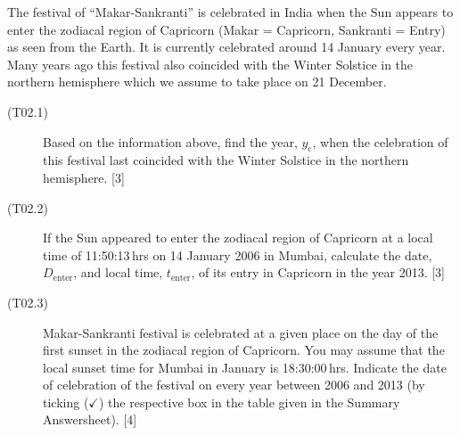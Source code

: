 The festival of ``Makar-Sankranti'' is celebrated in India when the Sun appears
to enter the zodiacal region of Capricorn (Makar = Capricorn, Sankranti =
Entry) as seen from the Earth. It is currently celebrated around 14 January
every year. Many years ago this festival also coincided with the Winter
Solstice in the northern hemisphere which we assume to take place on 21
December.

\begin{description}
\item[(T02.1)] Based on the information above, find the year, $y_{\mathrm{c}}$,
  when the celebration of this festival last coincided with the Winter Solstice
  in the northern hemisphere. \hfill[3]
\item[(T02.2)] If the Sun appeared to enter the zodiacal region of Capricorn at
  a local time of 11:50:13\,hrs on 14 January 2006 in Mumbai, calculate the
  date, $D_{\mathrm{enter}}$, and local time, $t_{\mathrm{enter}}$, of its
  entry in Capricorn in the year 2013. \hfill[3]
\item[(T02.3)] Makar-Sankranti festival is celebrated at a given place on the
  day of the first sunset in the zodiacal region of Capricorn. You may assume
  that the local sunset time for Mumbai in January is 18:30:00\,hrs. Indicate
  the date of celebration of the festival on every year between 2006 and 2013
  (by ticking ($\checkmark$) the respective box in the table given in the
  Summary Answersheet). \hfill[4]
\end{description}
